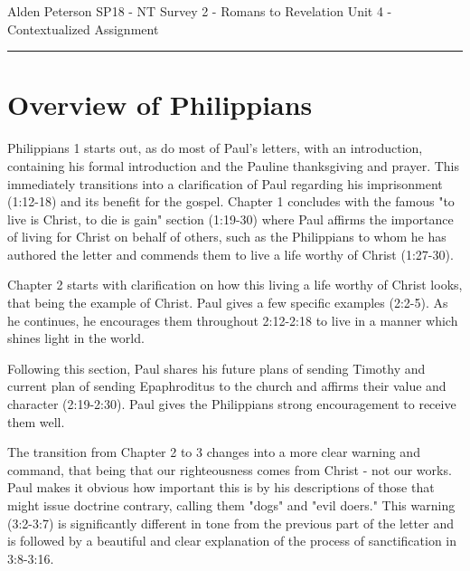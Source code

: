 \documentclass[12pt]{turabian-researchpaper}
\begin{document}
\begin{singlespace}
\noindent Alden Peterson \newline
\noindent SP18 - NT Survey 2 - Romans to Revelation\newline
\noindent Unit 4 - Contextualized Assignment
\newline\noindent\rule{4cm}{0.4pt}
\end{singlespace}



\section{Overview of Philippians}

Philippians 1 starts out, as do most of Paul's letters, with an introduction, containing his formal introduction and the Pauline thanksgiving and prayer. This immediately transitions into a clarification of Paul regarding his imprisonment (1:12-18) and its benefit for the gospel. Chapter 1 concludes with the famous "to live is Christ, to die is gain" section (1:19-30) where Paul affirms the importance of living for Christ on behalf of others, such as the Philippians to whom he has authored the letter and commends them to live a life worthy of Christ (1:27-30).

Chapter 2 starts with clarification on how this living a life worthy of Christ looks, that being the example of Christ. Paul gives a few specific examples (2:2-5). As he continues, he encourages them throughout 2:12-2:18 to live in a manner which shines light in the world.

Following this section, Paul shares his future plans of sending Timothy and current plan of sending Epaphroditus to the church and affirms their value and character (2:19-2:30). Paul gives the Philippians strong encouragement to receive them well.

The transition from Chapter 2 to 3 changes into a more clear warning and command, that being that our righteousness comes from Christ - not our works. Paul makes it obvious how important this is by his descriptions of those that might issue doctrine contrary, calling them "dogs" and "evil doers." This warning (3:2-3:7) is significantly different in tone from the previous part of the letter and is followed by a beautiful and clear explanation of the process of sanctification in 3:8-3:16. 
\end{document}
